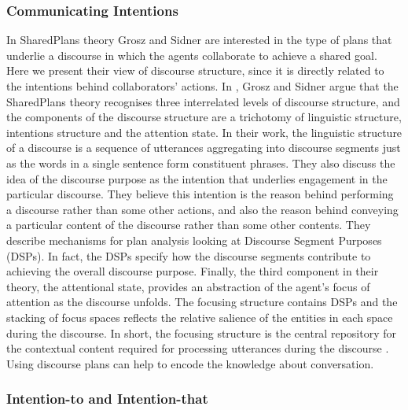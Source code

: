 \documentclass[12pt]{report}
\begin{document}
\subsubsection{Communicating Intentions}
In SharedPlans theory Grosz and Sidner are interested in the type of plans that
underlie a discourse in which the agents collaborate to achieve a shared goal.
Here we present their view of discourse structure, since it is directly related
to the intentions behind collaborators' actions. In
\cite{grosz:plans-discourse}, Grosz and Sidner argue that the SharedPlans theory
recognises three interrelated levels of discourse structure, and the components
of the discourse structure are a trichotomy of linguistic structure, intentions
structure and the attention state. In their work, the linguistic structure of a
discourse is a sequence of utterances aggregating into discourse segments just
as the words in a single sentence form constituent phrases. They also discuss
the idea of the discourse purpose as the intention that underlies engagement in
the particular discourse. They believe this intention is the reason behind
performing a discourse rather than some other actions, and also the reason
behind conveying a particular content of the discourse rather than some other
contents. They describe mechanisms for plan analysis looking at Discourse
Segment Purposes (DSPs). In fact, the DSPs specify how the discourse segments
contribute to achieving the overall discourse purpose. Finally, the third
component in their theory, the attentional state, provides an abstraction of the
agent's focus of attention as the discourse unfolds. The focusing structure
contains DSPs and the stacking of focus spaces reflects the relative salience of
the entities in each space during the discourse. In short, the focusing
structure is the central repository for the contextual content required for
processing utterances during the discourse \cite{grosz:plans-discourse}.
Using discourse plans can help to encode the knowledge about conversation.

\subsubsection{Intention-to and Intention-that}
\label{sec:intend-to-that}
\end{document}
